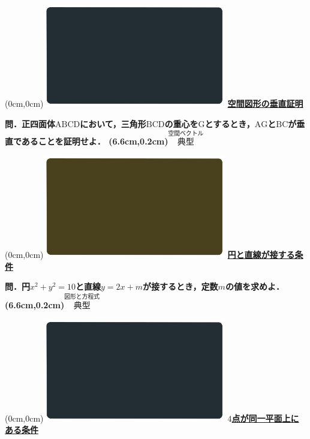 \documentclass[10pt,
fleqn,
dvipdfmx,
uplatex
]{jsarticle}
\begin{document}
\newpage



\at(0cm,0cm){\includegraphics[width=8cm,bb=0 0 1920 1080]{./youtube/thumbnails/templates/smart_background/空間ベクトル.jpeg}}
{\color{orange}\bf\boldmath\LARGE\underline{空間図形の垂直証明}}\vspace{0.3zw}

\LARGE 
\bf\boldmath 問．正四面体$\text{ABCD}$において，三角形$\text{BCD}$の重心を$\text{G}$とするとき，$\text{AG}$と$\text{BC}$が垂直であることを証明せよ．
\at(6.6cm,0.2cm){\small\color{bradorange}$\overset{\text{空間ベクトル}}{\text{典型}}$}


\newpage

\at(0cm,0cm){\includegraphics[width=8cm,bb=0 0 1920 1080]{./youtube/thumbnails/templates/smart_background/図形と方程式.jpeg}}
{\color{orange}\bf\boldmath\LARGE\underline{円と直線が接する条件}}\vspace{0.3zw}

\LARGE 
\bf\boldmath 問．円$x^2+y^2={10}$と直線$y=2x+m$が接するとき，定数$m$の値を求めよ．
\at(6.6cm,0.2cm){\small\color{bradorange}$\overset{\text{図形と方程式}}{\text{典型}}$}

\newpage



\at(0cm,0cm){\includegraphics[width=8cm,bb=0 0 1920 1080]{./youtube/thumbnails/templates/smart_background/空間ベクトル.jpeg}}
{\color{orange}\bf\boldmath\Large\underline{$4$点が同一平面上にある条件}}\vspace{0.3zw}
\end{document}
